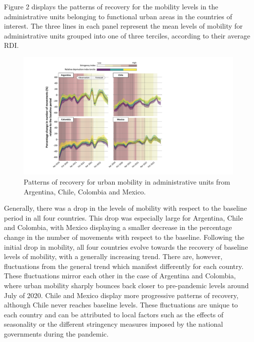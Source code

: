 \documentclass[
  11pt,
]{article}
\begin{document}
Figure 2 displays the patterns of recovery for the mobility levels in
the administrative units belonging to functional urban areas in the
countries of interest. The three lines in each panel represent the mean
levels of mobility for administrative units grouped into one of three
terciles, according to their average RDI.

\begin{figure}[H]

{\centering \includegraphics{figures/prediction-rdi-band.pdf}

}

\caption{Patterns of recovery for urban mobility in administrative units
from Argentina, Chile, Colombia and Mexico.}

\end{figure}%

Generally, there was a drop in the levels of mobility with respect to
the baseline period in all four countries. This drop was especially
large for Argentina, Chile and Colombia, with Mexico displaying a
smaller decrease in the percentage change in the number of movements
with respect to the baseline. Following the initial drop in mobility,
all four countries evolve towards the recovery of baseline levels of
mobility, with a generally increasing trend. There are, however,
fluctuations from the general trend which manifest differently for each
country. These fluctuations mirror each other in the case of Argentina
and Colombia, where urban mobility sharply bounces back closer to
pre-pandemic levels around July of 2020. Chile and Mexico display more
progressive patterns of recovery, although Chile never reaches baseline
levels. These fluctuations are unique to each country and can be
attributed to local factors such as the effects of seasonality or the
different stringency measures imposed by the national governments during
the pandemic.
\end{document}
